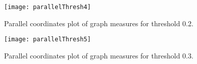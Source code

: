 	\begin{figure}
		\centering
	    \texttt{[image: parallelThresh4]}
	    \caption{Parallel coordinates plot of graph measures for threshold 0.2.}
	    \label{fig:parallelPlot4}
	\end{figure}

	\begin{figure}
			\centering
		    \texttt{[image: parallelThresh5]}
		    \caption{Parallel coordinates plot of graph measures for threshold 0.3.}
		    \label{fig:parallelPlot5}
	\end{figure}







